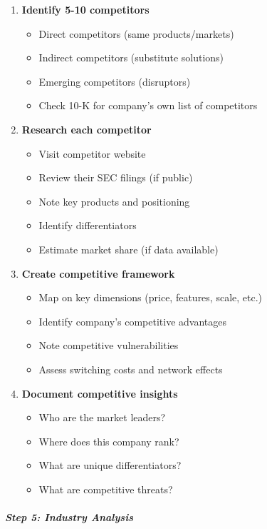 \documentclass[11pt]{article}
\begin{document}
\begin{enumerate}[leftmargin=*,itemsep=2pt,topsep=2pt]
\item {} \textbf{Identify 5-10 competitors}
\begin{itemize}[leftmargin=*,itemsep=2pt,topsep=2pt]
\item {} Direct competitors (same products/markets)
\item {} Indirect competitors (substitute solutions)
\item {} Emerging competitors (disruptors)
\item {} Check 10-K for company's own list of competitors
\end{itemize}
\item {} \textbf{Research each competitor}
\begin{itemize}[leftmargin=*,itemsep=2pt,topsep=2pt]
\item {} Visit competitor website
\item {} Review their SEC filings (if public)
\item {} Note key products and positioning
\item {} Identify differentiators
\item {} Estimate market share (if data available)
\end{itemize}
\item {} \textbf{Create competitive framework}
\begin{itemize}[leftmargin=*,itemsep=2pt,topsep=2pt]
\item {} Map on key dimensions (price, features, scale, etc.)
\item {} Identify company's competitive advantages
\item {} Note competitive vulnerabilities
\item {} Assess switching costs and network effects
\end{itemize}
\item {} \textbf{Document competitive insights}
\begin{itemize}[leftmargin=*,itemsep=2pt,topsep=2pt]
\item {} Who are the market leaders?
\item {} Where does this company rank?
\item {} What are unique differentiators?
\item {} What are competitive threats?
\end{itemize}
\end{enumerate}

\subparagraph{Step 5: Industry Analysis}\mbox{}\par
\end{document}
